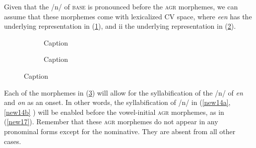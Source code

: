 \documentclass[output=paper,colorlinks,citecolor=brown,
]{langscibook}
\begin{document}
Given that the /n/ of \textsc{base} is pronounced before the \textsc{agr} morphemes, we can assume that these morphemes come with lexicalized CV space, where \textit{een} has the underlying representation in (\ref{new16a}), and ii the underlying representation in (\ref{new16b}).

\begin{figure}
    \centering
    \begin{subfigure}{.4\textwidth}
        \centering 
        \caption{Caption}
        \label{new16a}
    \end{subfigure}
    \begin{subfigure}{.4\textwidth}
        \centering 
        \caption{Caption}
        \label{new16b}
    \end{subfigure}
    \caption{Caption}
    \label{new16}
\end{figure}

Each of the morphemes in (\ref{new16}) will allow for the syllabification of the /n/ of \textit{en} and \textit{on} as an onset. In other words, the syllabification of /n/ in (\ref{new14a}, \ref{new14b} ) will be enabled before the vowel-initial \textsc{agr} morphemes, as in (\ref{new17}). Remember that these \textsc{agr} morphemes do not appear in any pronominal forms except for the nominative. They are absent from all other cases. 
\end{document}
